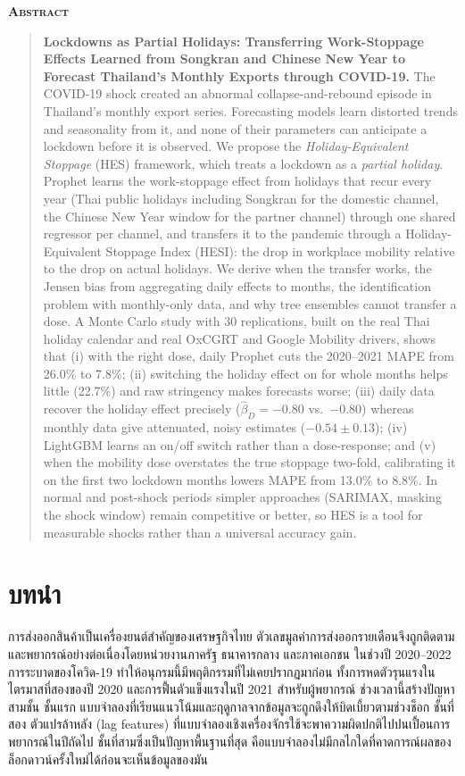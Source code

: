\documentclass{article}
\renewenvironment{abstract}[1][Abstract]{\centerline{\large\bfseries\scshape #1}\begin{quote}}{\end{quote}}
\theoremstyle{definition}
\begin{document}
\begin{abstract}
\noindent \textbf{Lockdowns as Partial Holidays: Transferring Work-Stoppage Effects Learned from Songkran and Chinese New Year to Forecast Thailand's Monthly Exports through COVID-19.}
The COVID-19 shock created an abnormal collapse-and-rebound episode in Thailand's monthly export series. Forecasting models learn distorted trends and seasonality from it, and none of their parameters can anticipate a lockdown before it is observed. We propose the \emph{Holiday-Equivalent Stoppage} (HES) framework, which treats a lockdown as a \emph{partial holiday}. Prophet learns the work-stoppage effect from holidays that recur every year (Thai public holidays including Songkran for the domestic channel, the Chinese New Year window for the partner channel) through one shared regressor per channel, and transfers it to the pandemic through a Holiday-Equivalent Stoppage Index (HESI): the drop in workplace mobility relative to the drop on actual holidays. We derive when the transfer works, the Jensen bias from aggregating daily effects to months, the identification problem with monthly-only data, and why tree ensembles cannot transfer a dose. A Monte Carlo study with 30 replications, built on the real Thai holiday calendar and real OxCGRT and Google Mobility drivers, shows that (i) with the right dose, daily Prophet cuts the 2020--2021 MAPE from 26.0\% to 7.8\%; (ii) switching the holiday effect on for whole months helps little (22.7\%) and raw stringency makes forecasts worse; (iii) daily data recover the holiday effect precisely ($\hat\beta_D=-0.80$ vs.\ $-0.80$) whereas monthly data give attenuated, noisy estimates ($-0.54\pm0.13$); (iv) LightGBM learns an on/off switch rather than a dose-response; and (v) when the mobility dose overstates the true stoppage two-fold, calibrating it on the first two lockdown months lowers MAPE from 13.0\% to 8.8\%. In normal and post-shock periods simpler approaches (SARIMAX, masking the shock window) remain competitive or better, so HES is a tool for measurable shocks rather than a universal accuracy gain.
\end{abstract}


\section{บทนำ}
การส่งออกสินค้าเป็นเครื่องยนต์สำคัญของเศรษฐกิจไทย ตัวเลขมูลค่าการส่งออกรายเดือนจึงถูกติดตามและพยากรณ์อย่างต่อเนื่องโดยหน่วยงานภาครัฐ ธนาคารกลาง และภาคเอกชน ในช่วงปี 2020--2022 การระบาดของโควิด-19 ทำให้อนุกรมนี้มีพฤติกรรมที่ไม่เคยปรากฏมาก่อน ทั้งการหดตัวรุนแรงในไตรมาสที่สองของปี 2020 และการฟื้นตัวแข็งแรงในปี 2021 สำหรับผู้พยากรณ์ ช่วงเวลานี้สร้างปัญหาสามชั้น ชั้นแรก แบบจำลองที่เรียนแนวโน้มและฤดูกาลจากข้อมูลจะถูกดึงให้บิดเบี้ยวตามช่วงช็อก ชั้นที่สอง ตัวแปรล้าหลัง (lag features) ที่แบบจำลองเชิงเครื่องจักรใช้จะพาความผิดปกติไปปนเปื้อนการพยากรณ์ในปีถัดไป ชั้นที่สามซึ่งเป็นปัญหาพื้นฐานที่สุด คือแบบจำลองไม่มีกลไกใดที่คาดการณ์ผลของล็อกดาวน์ครั้งใหม่ได้ก่อนจะเห็นข้อมูลของมัน
\end{document}

